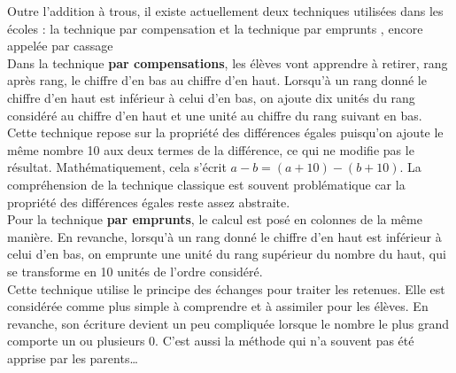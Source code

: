\smallskip


Outre l'addition à trous, il existe actuellement deux techniques utilisées dans les écoles : la technique \og par compensation \fg{} et la technique \og par emprunts \fg{}, encore appelée \og par cassage \fg \\
Dans la technique {\bf par compensations}, les élèves vont apprendre à retirer, rang après rang, le chiffre d'en bas au chiffre d'en haut. Lorsqu'à un rang donné le chiffre d'en haut est inférieur à celui d'en bas, on ajoute dix unités du rang considéré au chiffre d'en haut et une unité au chiffre du rang suivant en bas. Cette technique repose sur la propriété des différences égales puisqu'on ajoute le même nombre 10 aux deux termes de la différence, ce qui ne modifie pas le résultat. Mathématiquement, cela s'écrit $a-b =(a+10)-(b+10)$. La compréhension de la technique classique est souvent problématique car la propriété des différences égales reste assez abstraite. \\   
Pour la technique {\bf par emprunts}, le calcul est posé en colonnes de la même manière. En revanche, lorsqu'à un rang donné le chiffre d'en haut est inférieur à celui d'en bas, on \og emprunte \fg{} une unité du rang supérieur du nombre du haut, qui se transforme en 10 unités de l'ordre considéré. \\
Cette technique utilise le principe des échanges pour traiter les retenues. Elle est considérée comme plus simple à comprendre et à assimiler pour les élèves. En revanche, son écriture devient un peu compliquée lorsque le nombre le plus grand comporte un ou plusieurs 0. C'est aussi la méthode qui n'a souvent pas été apprise par les parents\dots{}
   
